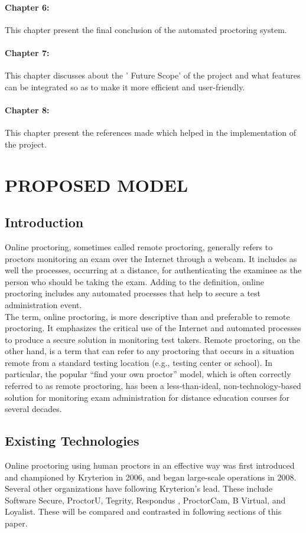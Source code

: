 \documentclass[12pt]{report}
\begin{document}
\subsubsection{Chapter 6:} This chapter present the final conclusion of the automated proctoring system.
\subsubsection{Chapter 7:}  This chapter discusses about the ' Future Scope' of the project and what features can be integrated so as to make it more efficient and user-friendly.
\subsubsection{Chapter 8:} This chapter present the references made which helped in the implementation of the project.
\pagebreak
\chapter{PROPOSED MODEL}
\section{ Introduction}
Online proctoring, sometimes called remote proctoring, generally refers to proctors monitoring an exam over the
Internet through a webcam. It includes as well the processes, occurring at a distance, for authenticating the examinee as
the person who should be taking the exam. Adding to the definition, online proctoring includes any automated
processes that help to secure a test administration event.\\


The term, online proctoring, is more descriptive than and preferable to remote proctoring. It emphasizes the critical use
of the Internet and automated processes to produce a secure solution in monitoring test takers. Remote proctoring, on
the other hand, is a term that can refer to any proctoring that occurs in a situation remote from a standard testing
location (e.g., testing center or school). In particular, the popular “find your own proctor” model, which is often correctly
referred to as remote proctoring, has been a less-than-ideal, non-technology-based solution for monitoring exam
administration for distance education courses for several decades.
\section{ Existing Technologies}
Online proctoring using human proctors in an effective way was first introduced and championed by Kryterion in 2006,
and began large-scale operations in 2008. Several other organizations have following Kryterion’s lead. These include
Software Secure, ProctorU, Tegrity, Respondus , ProctorCam, B Virtual, and Loyalist. These will be compared and
contrasted in following sections of this paper.\\
\end{document}
